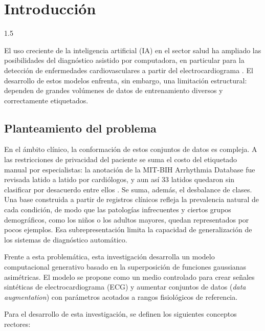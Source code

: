 
\section{Introducción}
\begin{spacing}{1.5}

El uso creciente de la inteligencia artificial (IA) en el sector salud ha ampliado las posibilidades del diagnóstico asistido por computadora, en particular para la detección de enfermedades cardiovasculares a partir del electrocardiograma \cite{brophy2023generative,wulan2020generating}. El desarrollo de estos modelos enfrenta, sin embargo, una limitación estructural: dependen de grandes volúmenes de datos de entrenamiento diversos y correctamente etiquetados.

\subsection{Planteamiento del problema}

En el ámbito clínico, la conformación de estos conjuntos de datos es compleja. A las restricciones de privacidad del paciente se suma el costo del etiquetado manual por especialistas: la anotación de la MIT-BIH Arrhythmia Database fue revisada latido a latido por cardiólogos, y aun así 33 latidos quedaron sin clasificar por desacuerdo entre ellos \cite{moody2001impact}. Se suma, además, el desbalance de clases. Una base construida a partir de registros clínicos refleja la prevalencia natural de cada condición, de modo que las patologías infrecuentes y ciertos grupos demográficos, como los niños o los adultos mayores, quedan representados por pocos ejemplos. Esa subrepresentación limita la capacidad de generalización de los sistemas de diagnóstico automático.

Frente a esta problemática, esta investigación desarrolla un modelo computacional generativo basado en la superposición de funciones gaussianas asimétricas. El modelo se propone como un medio controlado para crear señales sintéticas de electrocardiograma (ECG) y aumentar conjuntos de datos (\emph{data augmentation}) con parámetros acotados a rangos fisiológicos de referencia.

Para el desarrollo de esta investigación, se definen los siguientes conceptos rectores:


\end{spacing}
